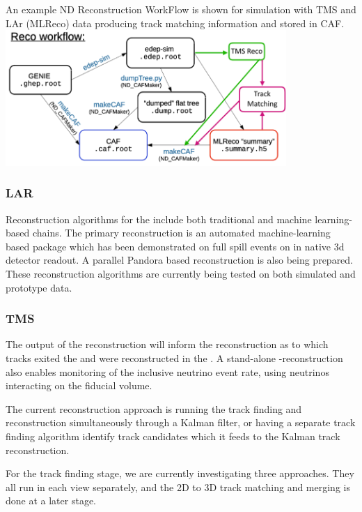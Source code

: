 \documentclass[../main-v1.tex]{subfiles}
\begin{document}
\begin{dunefigure}
\label{fig:nd:reco}
{An example ND Reconstruction WorkFlow is shown for simulation with TMS and LAr (MLReco) data producing track matching information and stored in CAF.}
\includegraphics[width=0.8\textwidth]{graphics/ND/ND-Reco-workflow.png}
\end{dunefigure}

\subsubsection{LAR}
 Reconstruction algorithms for the  include both traditional and machine learning-based chains. The primary reconstruction is an automated machine-learning based package which has been demonstrated on full spill events on in native 3d detector readout. A parallel Pandora based reconstruction is also being prepared. These reconstruction algorithms are currently being tested on both simulated and prototype data. 

\subsubsection{TMS}
The output of the  reconstruction will inform the  reconstruction as to which tracks exited the  and were reconstructed in the . A stand-alone -reconstruction also enables monitoring of the inclusive neutrino event rate, using neutrinos interacting on the  fiducial volume.

The current  reconstruction approach is running the track finding and reconstruction simultaneously through a Kalman filter, or having a separate track finding algorithm identify track candidates which it feeds to the Kalman track reconstruction.

For the track finding stage, we are currently investigating three approaches. They all run in each view separately, and the 2D to 3D track matching and merging is done at a later stage.
\end{document}
